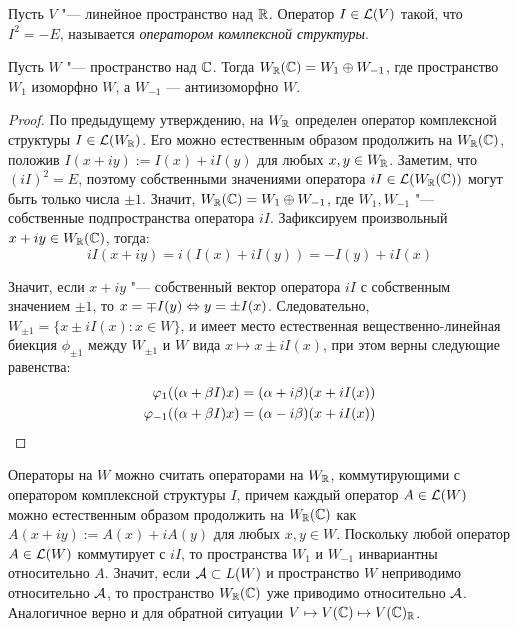 \begin{definition}
	Пусть $V$ "--- линейное пространство над $\R$. Оператор $I \in \mc L(V)$ такой, что $I^2 = -E$, называется \textit{оператором комлпексной структуры}.
\end{definition}

\begin{proposition}
	Пусть $W$ "--- пространство над $\Cm$. Тогда $W_\R(\Cm) = W_1 \oplus W_{-1}$, где пространство $W_1$ изоморфно $W$, а $W_{-1}$ --- антиизоморфно $W$.
\end{proposition}

\begin{proof}
	По предыдущему утверждению, на $W_\R$ определен оператор комплексной структуры $I \in \mc L(W_\R)$. Его можно естественным образом продолжить на $W_\R(\Cm)$, положив $I(x + iy) := I(x) + iI(y)$ для любых $x, y \in W_\R$. Заметим, что $(iI)^2 = E$, поэтому собственными значениями оператора $iI \in \mc L(W_\R(\Cm))$ могут быть только числа $\pm1$. Значит, $W_\R(\Cm) = W_1 \oplus W_{-1}$, где $W_1, W_{-1}$ "--- собственные подпространства оператора $iI$. Зафиксируем произвольный $x + iy \in W_\R(\Cm)$, тогда:
	\[iI(x + iy) = i(I(x) + iI(y)) = -I(y) + iI(x)\]
	
	Значит, если $x + iy$ "--- собственный вектор оператора $iI$ с собственным значением $\pm1$, то $x = \mp I(y) \lra y = \pm I(x)$. Следовательно, $W_{\pm1} = \{x \pm iI(x) : x \in W\}$, и имеет место естественная вещественно-линейная биекция $\phi_{\pm1}$ между $W_{\pm1}$ и $W$ вида $x \mapsto x \pm iI(x)$, при этом верны следующие равенства:
	\begin{align*}
		\phi_1((\alpha + \beta I)x) &= (\alpha + i\beta)(x + iI(x))\\
		\phi_{-1}((\alpha + \beta I)x) &= (\alpha - i\beta)(x + iI(x))\qedhere
	\end{align*}
\end{proof}

\begin{note}
	Операторы на $W$ можно считать операторами на $W_\R$, коммутирующими с оператором комплексной структуры $I$, причем каждый оператор $A \in \mc L(W)$ можно естественным образом продолжить на $W_\R(\Cm)$ как $A(x + iy) := A(x) + iA(y)$ для любых $x, y \in W$. Поскольку любой оператор $A \in \mc L(W)$ коммутирует с $iI$, то пространства $W_1$ и $W_{-1}$ инвариантны относительно $A$. Значит, если $\mc A \subset L(W)$ и пространство $W$ неприводимо относительно $\mc A$, то пространство $W_\R(\Cm)$ уже приводимо относительно $\mc A$. Аналогичное верно и для обратной ситуации $V \mapsto V(\Cm) \mapsto V(\Cm)_\R$.
\end{note}

